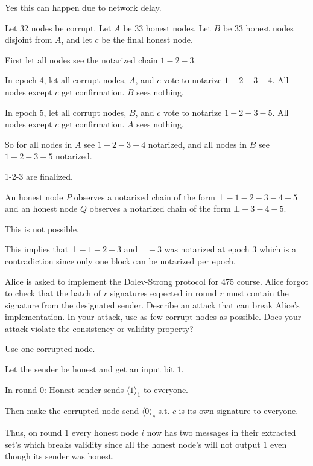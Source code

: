 \documentclass[12pt, letterpaper]{article}
\begin{document}
\begin{problemproof}
    Yes this can happen due to network delay.

    Let 32 nodes be corrupt. Let $A$ be 33 honest nodes. Let $B$ be 33 honest nodes disjoint from $A$, and let $c$ be the final honest node.

    First let all nodes see the notarized chain $1-2-3$.

    In epoch 4, let all corrupt nodes, $A$, and $c$ vote to notarize $1-2-3-4$. All nodes except $c$ get confirmation.
    $B$ sees nothing.

    In epoch 5, let all corrupt nodes, $B$, and $c$ vote to notarize $1-2-3-5$. All nodes except $c$ get confirmation.
    $A$ sees nothing.

    So for all nodes in $A$ see $1-2-3-4$ notarized, and all nodes in $B$ see $1-2-3-5$ notarized.

    1-2-3 are finalized.
\end{problemproof}
\begin{subproblem}{}
    An honest node $P$ observes a notarized chain of the form $\bot - 1 - 2 - 3 - 4 - 5$ and an honest node $Q$ observes a notarized chain of the form $\bot - 3 - 4 - 5$.
\end{subproblem}
\begin{problemproof}
    This is not possible.

    This implies that $\bot-1-2-3$ and $\bot-3$ was notarized at epoch 3 which is a contradiction since only one block can be notarized per epoch.
\end{problemproof}

\qh[]
\begin{subproblem}{}
    Alice is asked to implement the Dolev-Strong protocol for 475 course. Alice forgot to check that the batch of $r$ signatures expected in round $r$ must contain the signature from the designated sender. Describe an attack that can break Alice's implementation. In your attack, use as few corrupt nodes as possible. Does your attack violate the consistency or validity property? 
\end{subproblem}
\begin{problemproof}
    Use one corrupted node.

    Let the sender be honest and get an input bit $1$.

    In round 0: Honest sender sends $\langle 1 \rangle_1$ to everyone.

    Then make the corrupted node send $\langle 0 \rangle_c$ s.t. $c$ is its own signature to everyone.

    Thus, on round 1 every honest node $i$ now has two messages in their extracted set's which breaks validity since all the honest node's will not output $1$ even though its sender was honest.
\end{problemproof}
\end{document}
